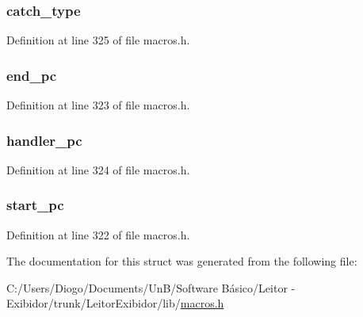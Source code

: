 \subsubsection[{catch\+\_\+type}]{ catch\+\_\+type}\label{struct_exception_table_a0f7b3379ca0a3516e71359436ae5abf1}


Definition at line 325 of file macros.\+h.

\hypertarget{struct_exception_table_a9c136439106544c4d1c986316d6d5fa2}{}
\subsubsection[{end\+\_\+pc}]{ end\+\_\+pc}\label{struct_exception_table_a9c136439106544c4d1c986316d6d5fa2}


Definition at line 323 of file macros.\+h.

\hypertarget{struct_exception_table_a69a19b4db26dd1a8341f02051cb221a7}{}
\subsubsection[{handler\+\_\+pc}]{ handler\+\_\+pc}\label{struct_exception_table_a69a19b4db26dd1a8341f02051cb221a7}


Definition at line 324 of file macros.\+h.

\hypertarget{struct_exception_table_a3ded0b47a89e0816c20dc577a82a1cd5}{}
\subsubsection[{start\+\_\+pc}]{ start\+\_\+pc}\label{struct_exception_table_a3ded0b47a89e0816c20dc577a82a1cd5}


Definition at line 322 of file macros.\+h.



The documentation for this struct was generated from the following file\+:\begin{DoxyCompactItemize}
\item 
C\+:/\+Users/\+Diogo/\+Documents/\+Un\+B/\+Software Básico/\+Leitor -\/ Exibidor/trunk/\+Leitor\+Exibidor/lib/\hyperlink{macros_8h}{macros.\+h}\end{DoxyCompactItemize}
